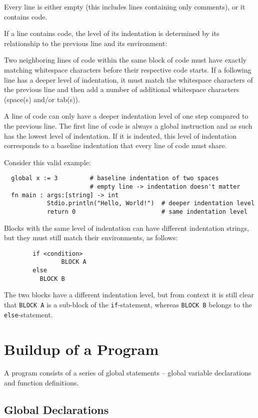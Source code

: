 \documentclass{article}
\newcommand{\code}[1]{\lstinline[columns=fixed]{#1}}
\begin{document}
		Every line is either empty (this includes lines containing only comments), or it contains code. 
		
		If a line contains code, the level of its indentation is determined by its relationship to the previous line and its environment:
		
		Two neighboring lines of code within the same block of code must have exactly matching whitespace characters before their respective code starts. If a following line has a deeper level of indentation, it must match the whitespace characters of the previous line and then add a number of additional whitespace characters (space(s) and/or tab(s)).
		
		A line of code can only have a deeper indentation level of one step compared to the previous line. The first line of code is always a global instruction and as such has the lowest level of indentation. If it is indented, this level of indentation corresponds to a baseline indentation that every line of code must share.
		
		Consider this valid example:
		
		\begin{lstlisting}
  global x := 3 		# baseline indentation of two spaces
						# empty line -> indentation doesn't matter
  fn main : args:[string] -> int
  			Stdio.println("Hello, World!")	# deeper indentation level
  			return 0						# same indentation level
		\end{lstlisting}
		
		Blocks with the same level of indentation can have different indentation strings, but they must still match their environments, as follows:
		
		\begin{lstlisting}
		if <condition>
				BLOCK A
		else
		  BLOCK B
		\end{lstlisting}
		
		The two blocks have a different indentation level, but from context it is still clear that \code{BLOCK A} is a sub-block of the \code{if}-statement, whereas \code{BLOCK B} belongs to the \code{else}-statement.
		
	\section{Buildup of a Program}
	
		A program consists of a series of global statements -- global variable declarations and function definitions.
		
		\subsection{Global Declarations}
		
\end{document}
